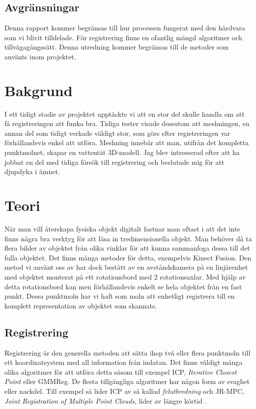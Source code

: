 \subsection{Avgränsningar}
\label{sec:limits-karlsson}
Denna rapport kommer begränsas till hur processen fungerat med den hårdvara som vi blivit tilldelade. För registrering finns en ofantlig mängd algoritmer och tillvägagångssätt. Denna utredning kommer begränsas till de metoder som använts inom projektet. 


\section{Bakgrund}
\label{sec:background-karlsson}
I ett tidigt stadie av projektet upptäckte vi att en stor del skulle handla om att få registreringen att funka bra. Tidiga tester visade dessutom att meshningen, en annan del som tidigt verkade väldigt stor, som görs efter registreringen var förhållandevis enkel att utföra. Meshning innebär att man, utifrån det kompletta punktmolnet, skapar en vattentät 3D-modell. Jag blev intresserad efter att ha jobbat en del med tidiga försök till registrering och beslutade mig för att djupdyka i ämnet.


\section{Teori}
\label{sec:theory-karlsson}

När man vill återskapa fysiska objekt digitalt fastnar man oftast i att det inte finns några bra verktyg för att läsa in tredimensionella objekt. Man behöver då ta flera bilder av objektet från olika vinklar för att kunna sammanfoga dessa till det fulla objektet. Det finns många metoder för detta, exempelvis Kinect Fusion. Den metod vi använt oss av har dock bestått av en avståndskamera på en linjärenhet med objektet monterat på ett rotationsbord med 2 rotationsaxlar. Med hjälp av detta rotationsbord kan men förhållandevis enkelt se hela objektet från en fast punkt. Dessa punktmoln har vi haft som moln att enhetligt registrera till en komplett representation av objektet som skannats.


\subsection{Registrering}
\label{sec:registrering-karlsson}

Registrering är den generella metoden att sätta ihop två eller flera punktmoln till ett koordinatsystem med all information från indatan. Det finns väldigt många olika algoritmer för att utföra detta såsom till exempel ICP, \textit{Iterative Closest Point} eller GMMReg. De flesta tillgängliga algoritmer har någon form av svaghet eller nackdel. Till exempel så lider ICP av så kallad \textit{felutbredning} och JR-MPC, \textit{Joint Registration of Multiple Point Clouds}, lider av längre körtid \cite{Evangelidis-ECCV-2014}.

